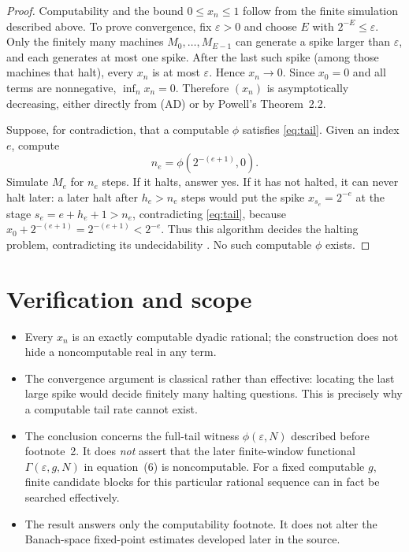 \documentclass[10pt]{article}
\begin{document}
\begin{proof}
Computability and the bound $0\le x_n\le1$ follow from the finite simulation
described above.  To prove convergence, fix $\varepsilon>0$ and choose $E$
with $2^{-E}\le\varepsilon$.  Only the finitely many machines
$M_0,\ldots,M_{E-1}$ can generate a spike larger than $\varepsilon$, and each
generates at most one spike.  After the last such spike (among those machines
that halt), every $x_n$ is at most $\varepsilon$.  Hence $x_n\to0$.  Since
$x_0=0$ and all terms are nonnegative, $\inf_n x_n=0$.  Therefore $(x_n)$ is
asymptotically decreasing, either directly from (AD) or by Powell's
Theorem~2.2.

Suppose, for contradiction, that a computable $\phi$ satisfies \eqref{eq:tail}.  Given an
index $e$, compute
\[
 n_e=\phi(2^{-(e+1)},0).
\]
Simulate $M_e$ for $n_e$ steps.  If it halts, answer yes.  If it has not
halted, it can never halt later: a later halt after $h_e>n_e$ steps would put
the spike $x_{s_e}=2^{-e}$ at the stage $s_e=e+h_e+1>n_e$, contradicting
\eqref{eq:tail}, because $x_0+2^{-(e+1)}=2^{-(e+1)}<2^{-e}$.  Thus this algorithm decides
the halting problem, contradicting its undecidability \cite{Turing}.  No such
computable $\phi$ exists.
\end{proof}

\section*{Verification and scope}

\begin{itemize}
\item Every $x_n$ is an exactly computable dyadic rational; the construction
does not hide a noncomputable real in any term.
\item The convergence argument is classical rather than effective: locating
the last large spike would decide finitely many halting questions.  This is
precisely why a computable tail rate cannot exist.
\item The conclusion concerns the full-tail witness $\phi(\varepsilon,N)$
described before footnote~2.  It does \emph{not} assert that the later
finite-window functional $\Gamma(\varepsilon,g,N)$ in equation~(6) is
noncomputable.  For a fixed computable $g$, finite candidate blocks for this
particular rational sequence can in fact be searched effectively.
\item The result answers only the computability footnote.  It does not alter
the Banach-space fixed-point estimates developed later in the source.
\end{itemize}
\end{document}
